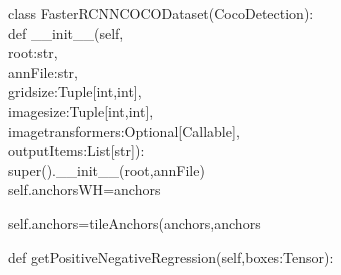 \begin{frame}
    \textcolor{vscodedef}{class}  \textcolor{vscodeclass}{FasterRCNNCOCODataset}\textcolor{vscodebracket}{(}\textcolor{vscodeclass}{CocoDetection}\textcolor{vscodebracket}{)}:\\

    \qquad\textcolor{vscodedef}{def} \textcolor{vscodefuncation}{\_\_init\_\_}\textcolor{vscodebracket}{(}\textcolor{vscodeparameter}{self},\\
    \qquad\qquad\textcolor{vscodeparameter}{root}:\textcolor{vscodeclass}{str},\\
    \qquad\qquad\textcolor{vscodeparameter}{annFile}:\textcolor{vscodeclass}{str},\\
    \qquad\qquad\textcolor{vscodeparameter}{gridsize}:\textcolor{vscodeclass}{Tuple}\textcolor{vscodecomment}{[}\textcolor{vscodeclass}{int},\textcolor{vscodeclass}{int}\textcolor{vscodecomment}{]},\\
    \qquad\qquad\textcolor{vscodeparameter}{imagesize}:\textcolor{vscodeclass}{Tuple}\textcolor{vscodecomment}{[}\textcolor{vscodeclass}{int},\textcolor{vscodeclass}{int}\textcolor{vscodecomment}{]},\\
    \qquad\qquad\textcolor{vscodeparameter}{imagetransformers}:\textcolor{vscodeclass}{Optional}\textcolor{vscodecomment}{[}\textcolor{vscodeclass}{Callable}\textcolor{vscodecomment}{]},\\
    \qquad\qquad\textcolor{vscodeparameter}{outputItems}:\textcolor{vscodeclass}{List}\textcolor{vscodecomment}{[}\textcolor{vscodeclass}{str}\textcolor{vscodecomment}{]}\textcolor{vscodebracket}{)}:\\

    \qquad\qquad\textcolor{vscodeclass}{super}\textcolor{vscodebracket}{()}.\textcolor{vscodefuncation}{\_\_init\_\_}\textcolor{vscodebracket}{(}\textcolor{vscodeparameter}{root},\textcolor{vscodeparameter}{annFile}\textcolor{vscodebracket}{)}\\

    \qquad\qquad\textcolor{vscodeparameter}{self}.\textcolor{vscodeparameter}{anchorsWH}=\textcolor{vscodeparameter}{anchors}

    \qquad\qquad\textcolor{vscodeparameter}{self}.\textcolor{vscodeparameter}{anchors}=\textcolor{vscodefuncation}{tileAnchors}\textcolor{vscodebracket}{(}\textcolor{vscodeparameter}{anchors},\textcolor{vscodeparameter}{anchors}

    \qquad\textcolor{vscodedef}{def}  \textcolor{vscodefuncation}{getPositiveNegativeRegression}\textcolor{vscodebracket}{(}\textcolor{vscodeparameter}{self},\textcolor{vscodeparameter}{boxes}:\textcolor{vscodeclass}{Tensor}\textcolor{vscodebracket}{)}:\\


\end{frame}
